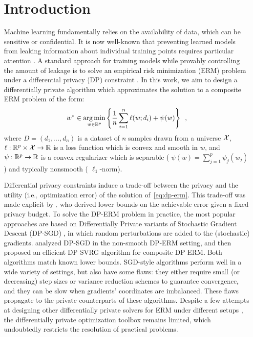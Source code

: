 
\section{Introduction}

Machine learning fundamentally relies on the availability of data, which can
be sensitive or confidential.
It is now well-known that preventing learned models from leaking information
about individual training points requires particular attention
\citep{shokri2017Membership}.
A standard approach for training models while provably controlling the amount of
leakage is to solve an empirical risk minimization (ERM) problem
under a differential privacy (DP) constraint \citep{chaudhuri2011Differentially}.
In this work, we aim to design a differentially private algorithm which
approximates the solution to a composite ERM problem of the form:
\begin{align}
  \label{eq:dp-erm}
  w^* \in
  \operatorname*{arg\,min}_{w \in \mathbb{R}^p}
  \left\{
  \frac{1}{n} \sum_{i=1}^n \ell(w; d_i) + \psi(w)
  \right\}
  \enspace,
\end{align}
where $D = (d_1, \dots, d_n)$
is a dataset of $n$ samples drawn from a universe $\mathcal X$,
$\ell: \mathbb R^p \times \mathcal X \rightarrow \mathbb R$ is a loss function which is convex
and smooth in $w$, and
$\psi: \mathbb R^p \rightarrow \mathbb R$ is a convex regularizer which is separable (\ie
$\psi(w) = \sum_{j=1}^p \psi_j(w_j)$) and typically nonsmooth (\eg
$\ell_1$-norm).

Differential privacy constraints induce a trade-off between the privacy and
the utility (i.e., optimization error) of the solution of~\eqref{eq:dp-erm}.
This trade-off was made explicit by \citet{bassily2014Private}, who derived
lower bounds on the achievable error given a fixed privacy budget.
To solve the DP-ERM problem in practice, the most popular approaches are based
on Differentially Private variants of Stochastic Gradient Descent (DP-SGD)
\citep{bassily2014Private,abadi2016Deep,wang2017Differentially}, in which
random perturbations are added to the (stochastic) gradients.
\citet{bassily2014Private} analyzed DP-SGD in the non-smooth DP-ERM setting,
and \citet{wang2017Differentially} then proposed an efficient DP-SVRG
algorithm for composite DP-ERM.
Both algorithms match known lower bounds.
SGD-style algorithms perform well in a wide variety of settings, but
also have some flaws: they either require small (or decreasing) step
sizes or variance reduction schemes to guarantee convergence, and they
can be slow when gradients' coordinates are imbalanced.
These flaws propagate to the private counterparts of these
algorithms.
Despite a few attempts at designing other differentially private solvers for
ERM under different setups
\citep{talwar2015Nearly,damaskinos2021Differentially}, the differentially
private optimization toolbox remains limited, which undoubtedly restricts the
resolution of practical problems.




